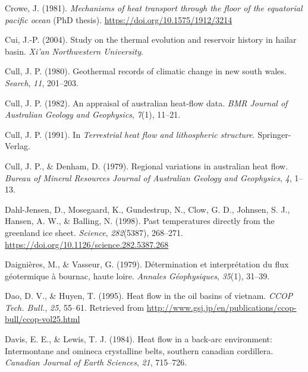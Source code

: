 \begin{CSLReferences}{1}{1}
\leavevmode{}%
Crowe, J. (1981). \emph{Mechanisms of heat transport through the floor of the equatorial pacific ocean} (PhD thesis). \url{https://doi.org/10.1575/1912/3214}

\leavevmode{}%
Cui, J.-P. (2004). Study on the thermal evolution and reservoir history in hailar basin. \emph{Xi'an Northwestern University}.

\leavevmode{}%
Cull, J. P. (1980). Geothermal records of climatic change in new south wales. \emph{Search}, \emph{11}, 201--203.

\leavevmode{}%
Cull, J. P. (1982). An appraisal of australian heat-flow data. \emph{BMR Journal of Australian Geology and Geophysics}, \emph{7}(1), 11--21.

\leavevmode{}%
Cull, J. P. (1991). In \emph{Terrestrial heat flow and lithospheric structure}. Springer-Verlag.

\leavevmode{}%
Cull, J. P., \& Denham, D. (1979). Regional variations in australian heat flow. \emph{Bureau of Mineral Resources Journal of Australian Geology and Geophysics}, \emph{4}, 1--13.

\leavevmode{}%
Dahl-Jensen, D., Mosegaard, K., Gundestrup, N., Clow, G. D., Johnsen, S. J., Hansen, A. W., \& Balling, N. (1998). Past temperatures directly from the greenland ice sheet. \emph{Science}, \emph{282}(5387), 268--271. \url{https://doi.org/10.1126/science.282.5387.268}

\leavevmode{}%
Daignières, M., \& Vasseur, G. (1979). Détermination et interprétation du flux géotermique à bournac, haute loire. \emph{Annales Géophysiques}, \emph{35}(1), 31--39.

\leavevmode{}%
Dao, D. V., \& Huyen, T. (1995). Heat flow in the oil basins of vietnam. \emph{CCOP Tech. Bull.}, \emph{25}, 55--61. Retrieved from \url{http://www.gsj.jp/en/publications/ccop-bull/ccop-vol25.html}

\leavevmode{}%
Davis, E. E., \& Lewis, T. J. (1984). Heat flow in a back-arc environment: Intermontane and omineca crystalline belts, southern canadian cordillera. \emph{Canadian Journal of Earth Sciences}, \emph{21}, 715--726.


\end{CSLReferences}
